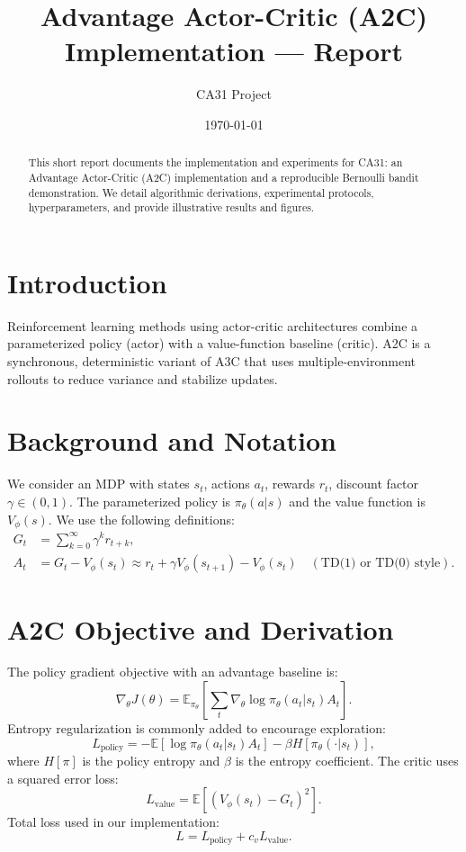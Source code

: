 \documentclass[11pt]{article}
\title{Advantage Actor-Critic (A2C) Implementation — Report}
\author{CA31 Project}
\date{\today}
\begin{document}
\maketitle
\begin{abstract}
This short report documents the implementation and experiments for CA31: an
Advantage Actor-Critic (A2C) implementation and a reproducible Bernoulli
bandit demonstration. We detail algorithmic derivations, experimental
protocols, hyperparameters, and provide illustrative results and figures.
\end{abstract}
\section{Introduction}
Reinforcement learning methods using actor-critic architectures combine a
parameterized policy (actor) with a value-function baseline (critic). A2C is
a synchronous, deterministic variant of A3C that uses multiple-environment
rollouts to reduce variance and stabilize updates.
\section{Background and Notation}
We consider an MDP with states $s_t$, actions $a_t$, rewards $r_t$, discount
factor $\gamma\in(0,1)$. The parameterized policy is $\pi_\theta(a|s)$ and the
value function is $V_\phi(s)$. We use the following definitions:
\begin{align}
G_t &= \sum_{k=0}^{\infty} \gamma^{k} r_{t+k},\\
A_t &= G_t - V_\phi(s_t) \approx r_t + \gamma V_\phi(s_{t+1}) - V_\phi(s_t)\quad(\text{TD(1) or TD(0) style}).
\end{align}
\section{A2C Objective and Derivation}
The policy gradient objective with an advantage baseline is:
\begin{equation}
\nabla_\theta J(\theta) = \mathbb{E}_{\pi_\theta} \left[\sum_t \nabla_\theta \log \pi_\theta(a_t|s_t) A_t\right].
\end{equation}
Entropy regularization is commonly added to encourage exploration:
\begin{equation}
L_{\text{policy}} = -\mathbb{E}[\log \pi_\theta(a_t|s_t) A_t] - \beta H[\pi_\theta(\cdot|s_t)],
\end{equation}
where $H[\pi]$ is the policy entropy and $\beta$ is the entropy coefficient.
The critic uses a squared error loss:
\begin{equation}
L_{\text{value}} = \mathbb{E}[ (V_\phi(s_t) - G_t)^2 ].
\end{equation}
Total loss used in our implementation:
\begin{equation}
L = L_{\text{policy}} + c_v L_{\text{value}}.
\end{equation}
\end{document}
